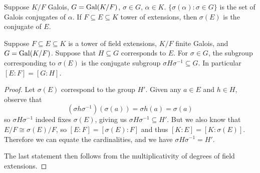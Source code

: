 \begin{definition}
    Suppose \(K/F\) Galois, \(G = \operatorname{Gal}(K/F)\),
    \(\sigma \in G\), \(\alpha \in K\).
    \(\{\sigma(\alpha) : \sigma \in G\}\) is the set of Galois conjugates of \(\alpha\).
    If \(F \subseteq E \subseteq K\) tower of extensions,
    then \(\sigma(E)\) is the conjugate of \(E\).
\end{definition}
\begin{proposition}\label{prop:galois-conjugate}
    Suppose \(F \subseteq E \subseteq K\) is a tower of field extensions,
    \(K/F\) finite Galois, and \(G = \operatorname{Gal}(K/F)\).
    Suppose that \(H \subseteq G\) corresponds to \(E\).
    For \(\sigma \in G\),
    the subgroup corresponding to \(\sigma(E)\)
    is the conjugate subgroup \(\sigma H \sigma^{-1} \subseteq G\).
    In particular \([E:F] = [G:H]\).
\end{proposition}
\begin{proof}
    Let \(\sigma(E)\) correspond to the group \(H'\).
    Given any \(a \in E\) and \(h \in H\), observe that
    \begin{equation*}
        (\sigma h \sigma^{-1})(\sigma(a)) = \sigma h(a) = \sigma(a)
    \end{equation*}
    so \(\sigma H \sigma^{-1}\) indeed fixes \(\sigma(E)\),
    giving us \(\sigma H \sigma^{-1} \subseteq H'\).
    But we also know that \(E/F \cong \sigma(E)/F\),
    so \([E:F] = [\sigma(E):F]\) and thus \([K:E] = [K:\sigma(E)]\).
    Therefore we can equate the cardinalities, and we have \(\sigma H \sigma^{-1} = H'\).

    The last statement then follows from the multiplicativity of degrees of field extensions.
\end{proof}

